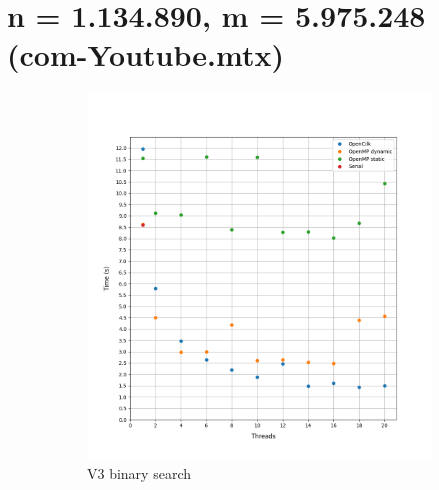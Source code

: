 \documentclass[12pt, a4paper]{article}
\begin{document}
\pagebreak
\section{n = 1.134.890, m = 5.975.248 (com-Youtube.mtx)}

\begin{figure}[h!]
     \begin{subfigure}[b]{0.33\textwidth}
         \centering
         \includegraphics[height=.4\textheight, width=\textwidth, keepaspectratio]{assets/youtube/v3.png}
    \caption{V3 binary search}
     \end{subfigure}
     \hfill
     \begin{subfigure}[b]{0.33\textwidth}
         \centering

\end{subfigure}
\end{figure}
\end{document}
